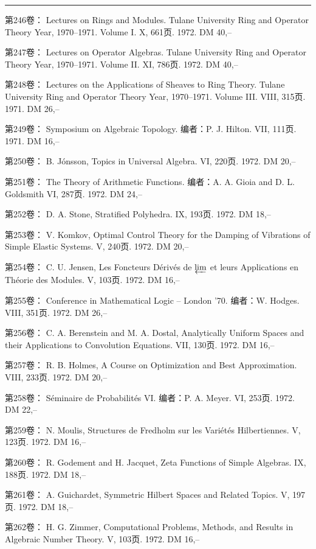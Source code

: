 \noindent\rule{\linewidth}{0.4pt}

第246卷： Lectures on Rings and Modules. Tulane University Ring and Operator Theory Year, 1970--1971. Volume I. X, 661页. 1972. DM 40,--

第247卷： Lectures on Operator Algebras. Tulane University Ring and Operator Theory Year, 1970--1971. Volume II. XI, 786页. 1972. DM 40,--

第248卷： Lectures on the Applications of Sheaves to Ring Theory. Tulane University Ring and Operator Theory Year, 1970--1971. Volume III. VIII, 315页. 1971. DM 26,--

第249卷： Symposium on Algebraic Topology. 编者：P. J. Hilton. VII, 111页. 1971. DM 16,--

第250卷： B. Jónsson, Topics in Universal Algebra. VI, 220页. 1972. DM 20,--

第251卷： The Theory of Arithmetic Functions. 编者：A. A. Gioia and D. L. Goldsmith VI, 287页. 1972. DM 24,--

第252卷： D. A. Stone, Stratified Polyhedra. IX, 193页. 1972. DM 18,--

第253卷： V. Komkov, Optimal Control Theory for the Damping of Vibrations of Simple Elastic Systems. V, 240页. 1972. DM 20,--

第254卷： C. U. Jensen, Les Foncteurs Dérivés de $\varprojlim$ et leurs Applications en Théorie des Modules. V, 103页. 1972. DM 16,--

第255卷： Conference in Mathematical Logic -- London '70. 编者：W. Hodges. VIII, 351页. 1972. DM 26,--

第256卷： C. A. Berenstein and M. A. Dostal, Analytically Uniform Spaces and their Applications to Convolution Equations. VII, 130页. 1972. DM 16,--

第257卷： R. B. Holmes, A Course on Optimization and Best Approximation. VIII, 233页. 1972. DM 20,--

第258卷： Séminaire de Probabilités VI. 编者：P. A. Meyer. VI, 253页. 1972. DM 22,--

第259卷： N. Moulis, Structures de Fredholm sur les Variétés Hilbertiennes. V, 123页. 1972. DM 16,--

第260卷： R. Godement and H. Jacquet, Zeta Functions of Simple Algebras. IX, 188页. 1972. DM 18,--

第261卷： A. Guichardet, Symmetric Hilbert Spaces and Related Topics. V, 197页. 1972. DM 18,--

第262卷： H. G. Zimmer, Computational Problems, Methods, and Results in Algebraic Number Theory. V, 103页. 1972. DM 16,--

